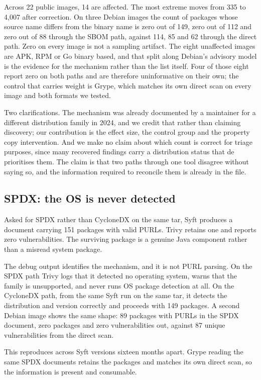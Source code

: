 Across 22 public images, 14 are affected. The most extreme moves from 335 to
4,007 after correction. On three Debian images the count of packages whose source
name differs from the binary name is zero out of 149, zero out of 112 and zero
out of 88 through the SBOM path, against 114, 85 and 62 through the direct path.
Zero on every image is not a sampling artifact. The eight unaffected images are
APK, RPM or Go binary based, and that split along Debian's advisory model is the
evidence for the mechanism rather than the list itself. Four of those eight
report zero on both paths and are therefore uninformative on their own; the
control that carries weight is Grype, which matches its own direct
scan on every image and both formats we tested.

Two clarifications. The mechanism was already documented by a maintainer for a
different distribution family in 2024, and we credit that rather than claiming
discovery; our contribution is the effect size, the control group and the
property copy intervention. And we make no claim about which count is correct for
triage purposes, since many recovered findings carry a distribution status that
de prioritises them. The claim is that two paths through one tool disagree
without saying so, and the information required to reconcile them is already in
the file.

\subsection{SPDX: the OS is never detected}

Asked for SPDX rather than CycloneDX on the same tar, Syft produces a
document carrying 151 packages with valid PURLs. Trivy retains
one and reports zero vulnerabilities. The surviving package is a genuine Java
component rather than a misread system package.

The debug output identifies the mechanism, and it is not PURL parsing. On the
SPDX path Trivy logs that it detected no operating system, warns that the
family is unsupported, and never runs OS package detection at all. On the
CycloneDX path, from the same Syft run on the same tar, it detects the
distribution and version correctly and proceeds with 149 packages. A second
Debian image shows the same shape: 89 packages with PURLs in the SPDX document,
zero packages and zero vulnerabilities out, against 87 unique vulnerabilities
from the direct scan.

This reproduces across Syft versions sixteen months apart. Grype
reading the same SPDX documents retains the packages and matches its own direct
scan, so the information is present and consumable.

